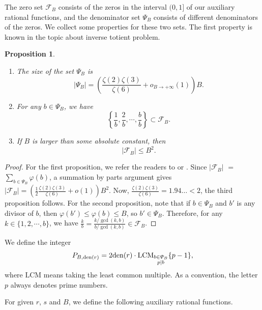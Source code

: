 \documentclass[11pt]{amsart}
\newtheorem{proposition}[theorem]{Proposition}
\numberwithin{equation}{section}
\begin{document}
The zero set $\mathcal{F}_B$ consists of the zeros in the interval $(0,1]$ of our auxiliary rational functions, and the denominator set $\mathcal{\varPsi}_B$ consists of different denominators of the zeros. We collect some properties for these two sets. The first property is known in the topic about inverse totient problem.

\smallskip
\begin{proposition}\label{SetProposition}
\begin{enumerate}
\item [(1)] The size of the set $\mathcal{\varPsi}_B$ is
\[ \left| \mathcal{\varPsi}_B \right| = \left( \frac{\zeta(2)\zeta(3)}{\zeta(6)} + o_{B \rightarrow +\infty}(1) \right) B. \]
\item [(2)] For any $b \in \mathcal{\varPsi}_B$, we have
\[ \left\{ \frac{1}{b},\frac{2}{b},\cdots,\frac{b}{b}  \right\} \subset \mathcal{F}_{B}.  \]
\item [(3)] If $B$ is larger than some absolute constant, then
\[ \left| \mathcal{F}_{B} \right| \leqslant B^2. \]
\end{enumerate}
\end{proposition}

\begin{proof}
For the first proposition, we refer the readers to \cite{Dr70} or \cite{Ba72}. Since $|\mathcal{F}_{B}|$ $=$ $\sum_{b \in \mathcal{\varPsi}_B} \varphi(b)$, a summation by parts argument gives $|\mathcal{F}_{B}| =\left(\frac{1}{2}\frac{\zeta(2)\zeta(3)}{\zeta(6)}+o(1)\right)B^2$. Now, $\frac{\zeta(2)\zeta(3)}{\zeta(6)} = 1.94\ldots < 2$, the third proposition follows. For the second proposition, note that if $b \in \mathcal{\varPsi}_B$ and $b'$ is any divisor of $b$, then $\varphi(b') \leqslant \varphi(b) \leqslant B$, so $b' \in \mathcal{\varPsi}_B$. Therefore, for any $k \in \{ 1,2,\cdots,b \}$, we have $\frac{k}{b} = \frac{k/\gcd(k,b)}{b/\gcd(k,b)} \in \mathcal{F}_{B}$.
\end{proof}
\smallskip

We define the integer
\begin{equation}\label{P}
P_{B,{\rm den}(r)} = 2{\rm den}(r) \cdot \text{LCM}_{\substack{b \in \mathcal{\varPsi}_B \\ p \mid b}}\{ p-1 \} ,
\end{equation}
where $\text{LCM}$ means taking the least common multiple. As a convention, the letter $p$ always denotes prime numbers.

For given $r$, $s$ and $B$, we define the following auxiliary rational functions.
\end{document}
